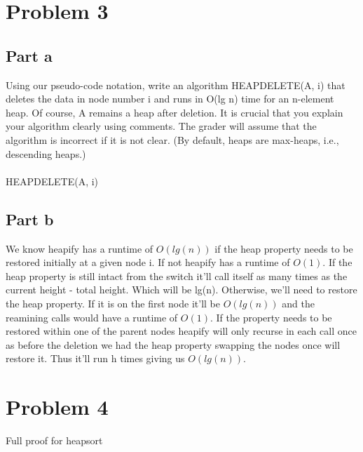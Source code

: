 \documentclass{article}
\begin{document}
\section*{Problem 3}
\subsection*{Part a}

Using our pseudo-code notation, write an algorithm HEAPDELETE(A, i) that
deletes the data in node number i and runs in O(lg n) time for an n-element
heap. Of course, A remains a heap after deletion.
It is crucial that you explain your algorithm clearly using comments. The grader
will assume that the algorithm is incorrect if it is not clear.
(By default, heaps are max-heaps, i.e., descending heaps.)\\\\

HEAPDELETE(A, i)
\begin{algorithmic}[1]
     
     
     
         
         
\end{algorithmic}

\subsection*{Part b}
We know heapify has a runtime of $O(lg(n))$ if the heap property 
needs to be restored initially at a given node i. If not heapify 
has a runtime of $O(1)$. If the heap property is still intact 
from the switch it'll call itself as many times as the current 
height - total height. Which will be lg(n). Otherwise, we'll 
need to restore the heap property. If it is on the first node 
it'll be $O(lg(n))$ and the reamining calls would have a runtime of 
$O(1)$. If the property needs to be restored within one of the parent
nodes heapify will only recurse in each call once as before the deletion 
we had the heap property swapping the nodes once will restore it. Thus 
it'll run h times giving us $O(lg(n))$.\\


\section*{Problem 4}
Full proof for heapsort\\\\
\end{document}
